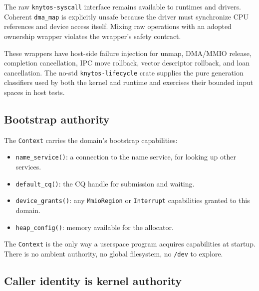The raw \texttt{knytos-syscall} interface remains available to runtimes and
drivers. Coherent \texttt{dma\_map} is explicitly unsafe because the driver
must synchronize CPU references and device access itself. Mixing raw
operations with an adopted ownership wrapper violates the wrapper's safety
contract.

These wrappers have host-side failure injection for unmap, DMA/MMIO release,
completion cancellation, IPC move rollback, vector descriptor rollback, and
loan cancellation. The no-std \texttt{knytos-lifecycle} crate supplies the
pure generation classifiers used by both the kernel and runtime and exercises
their bounded input spaces in host tests.

\subsection{Bootstrap authority}

The \texttt{Context} carries the domain's bootstrap capabilities:

\begin{itemize}
    \item \texttt{name\_service()}: a connection to the name service, for
        looking up other services.
    \item \texttt{default\_cq()}: the CQ handle for submission and waiting.
    \item \texttt{device\_grants()}: any \texttt{MmioRegion} or
        \texttt{Interrupt} capabilities granted to this domain.
    \item \texttt{heap\_config()}: memory available for the allocator.
\end{itemize}

The \texttt{Context} is the only way a userspace program acquires capabilities
at startup. There is no ambient authority, no global filesystem, no
\texttt{/dev} to explore.

\subsection{Caller identity is kernel authority}

